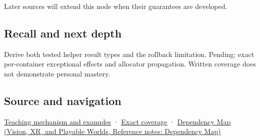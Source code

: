 Later sources will extend this node when their guarantees are developed.

\subsection{Recall and next depth}\label{appendix-c746afaa47d1-recall-and-next-depth}

Derive both tested helper result types and the rollback limitation. Pending: exact per-container exceptional effects and allocator propagation. Written coverage does not demonstrate personal mastery.

\subsection{Source and navigation}\label{appendix-c746afaa47d1-source-and-navigation}

\hyperref[01-foundations-i-ch003-failure-guarantees-shape-the-transfer-algorithm]{Teaching mechanism and examples} · \hyperref[appendix-fd090d982a15-m009---parts-127-147]{Exact coverage} · \href{../07-Vision-XR-and-Playable-Worlds/main.pdf\#nameddest=appendix-4ad47bdd269a}{Dependency Map (Vision, XR, and Playable Worlds, Reference notes: Dependency Map)}
